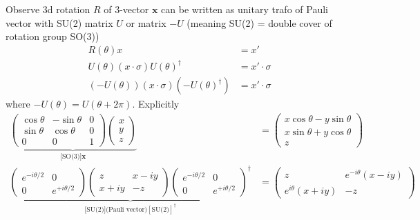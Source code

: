 \documentclass[../main.tex]{subfiles}
\begin{document}
\begin{itemize}
Observe 3d rotation $R$ of 3-vector $\mathbf{x}$ can be written as unitary trafo of Pauli vector with SU(2) matrix $U$ or matrix $-U$ (meaning SU(2) = double cover of rotation group SO(3))
\begin{align}
R(\theta)x&=x'\\
U(\theta)(x\cdot\sigma)U(\theta)^\dagger&=x'\cdot\sigma\\
\left(-U(\theta)\right)(x\cdot\sigma)\left(-U(\theta)^\dagger\right)&=x'\cdot\sigma
\end{align}
where $-U(\theta)=U(\theta+2\pi)$. Explicitly
\begin{align}
\underbrace{\left(\begin{matrix}
\cos\theta & -\sin\theta & 0\\
\sin\theta & \cos\theta & 0\\
0 & 0 & 1 
\end{matrix}\right)
\left(\begin{matrix}
x\\ y\\z
\end{matrix}\right)}_{\text{[SO(3)]}\mathbf{x}}
&=\left(\begin{matrix}
x\cos\theta - y\sin\theta\\ 
x\sin\theta + y\cos\theta\\
z
\end{matrix}\right)
\\
\underbrace{\left(\begin{matrix}
e^{-i\theta/2} & 0\\
0 & e^{+i\theta/2}
\end{matrix}
\right)
\left(\begin{matrix}
z & x-iy\\
x+iy & -z
\end{matrix}
\right)
\left(\begin{matrix}
e^{-i\theta/2} & 0\\
0 & e^{+i\theta/2}
\end{matrix}
\right)^\dagger}_{\text{[SU(2)]}\text{(Pauli vector)}[\text{SU(2)}]^\dagger}
&=\left(\begin{matrix}
z & e^{-i\theta}(x-iy)\\
e^{i\theta}(x+iy) & -z
\end{matrix}
\right)
\end{align}


\end{itemize}
\end{document}
